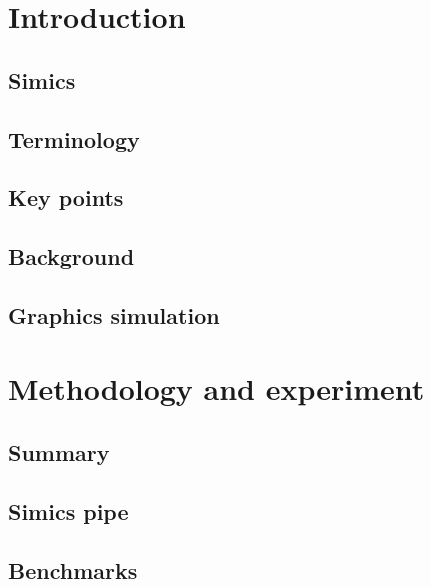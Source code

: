 \documentclass{beamer} %
\begin{document}
	

	\section{Introduction}

	\subsection{Simics}
	

        \subsection{Terminology}
        
        

	\subsection{Key points}
	

        \subsection{Background}
        
        

	\subsection{Graphics simulation}
	

        \section{Methodology and experiment}

        \subsection{Summary}
	

	\subsection{Simics pipe}
	

        \subsection{Benchmarks}
	
\end{document}
